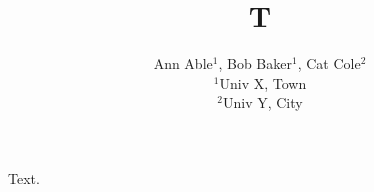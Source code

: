 \documentclass{article}
\begin{document}
\title{T}
\author{Ann Able$^{1}$, Bob Baker$^{1}$, Cat Cole$^{2}$ \\ $^1$Univ X, Town \\ $^2$Univ Y, City}
\maketitle
Text.
\end{document}
